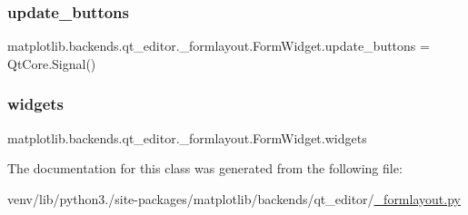 \subsubsection{\texorpdfstring{update\+\_\+buttons}{update\_buttons}}
{\footnotesize\ttfamily matplotlib.\+backends.\+qt\+\_\+editor.\+\_\+formlayout.\+Form\+Widget.\+update\+\_\+buttons = Qt\+Core.\+Signal()\hspace{0.3cm}{\ttfamily [static]}}

\mbox{\label{classmatplotlib_1_1backends_1_1qt__editor_1_1__formlayout_1_1FormWidget_ac1bc4cf16f88cd59a67b160516ba3098}} 
\subsubsection{\texorpdfstring{widgets}{widgets}}
{\footnotesize\ttfamily matplotlib.\+backends.\+qt\+\_\+editor.\+\_\+formlayout.\+Form\+Widget.\+widgets}



The documentation for this class was generated from the following file\+:\begin{DoxyCompactItemize}
\item 
venv/lib/python3./site-\/packages/matplotlib/backends/qt\+\_\+editor/\hyperlink{__formlayout_8py}{\+\_\+formlayout.\+py}\end{DoxyCompactItemize}
